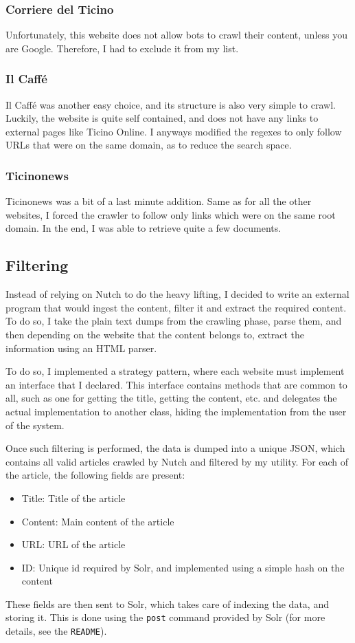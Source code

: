 \documentclass[a4paper]{article}
\begin{document}
\subsubsection{Corriere del Ticino}
Unfortunately, this website does not allow bots to crawl their content, unless you are Google. Therefore, I had to exclude it from my list. 

\subsubsection{Il Caff\'e}
Il Caff\'e was another easy choice, and its structure is also very simple to crawl. Luckily, the website is quite self contained, and does not have any links to external pages like Ticino Online. I anyways modified the regexes to only follow URLs that were on the same domain, as to reduce the search space. 

\subsubsection{Ticinonews}
Ticinonews was a bit of a last minute addition. Same as for all the other websites, I forced the crawler to follow only links which were on the same root domain. In the end, I was able to retrieve quite a few documents. 
\subsection{Filtering}
Instead of relying on Nutch to do the heavy lifting, I decided to write an external program that would ingest the content, filter it and extract the required content. To do so, I take the plain text dumps from the crawling phase, parse them, and then depending on the website that the content belongs to, extract the information using an HTML parser.

To do so, I implemented a strategy pattern, where each website must implement an interface that I declared. This interface contains methods that are common to all, such as one for getting the title, getting the content, etc. and delegates the actual implementation to another class, hiding the implementation from the user of the system. 

Once such filtering is performed, the data is dumped into a unique JSON, which contains all valid articles crawled by Nutch and filtered by my utility. For each of the article, the following fields are present:
\begin{itemize}
\item Title: Title of the article
\item Content: Main content of the article
\item URL: URL of the article
\item ID: Unique id required by Solr, and implemented using a simple hash on the content
\end{itemize}
These fields are then sent to Solr, which takes care of indexing the data, and storing it. This is done using the \texttt{post} command provided by Solr (for more details, see the \texttt{README}).
\end{document}
